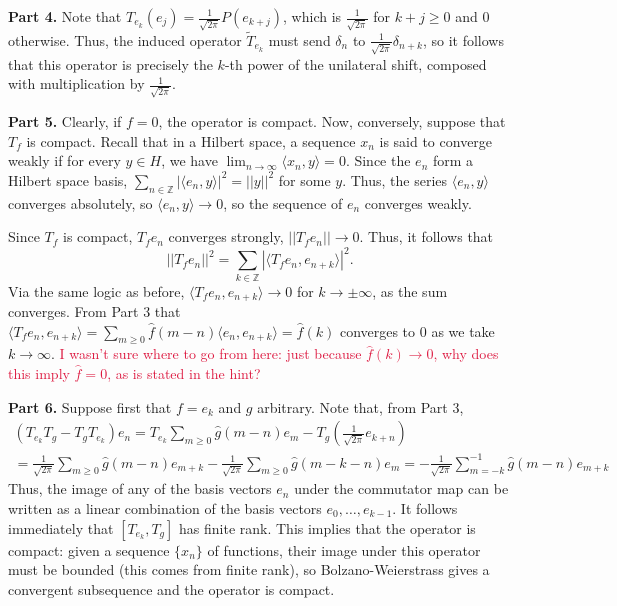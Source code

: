 \documentclass[aps,pra,showpacs,notitlepage,onecolumn,superscriptaddress,nofootinbib]{revtex4-1}
\newcommand{\pop}[1]{\textcolor{crimson}{#1}}
\theoremstyle{definition}
\begin{document}
\noindent \textbf{Part 4.} Note that $T_{e_k}(e_j) = \frac{1}{\sqrt{2\pi}} P(e_{k + j})$, which is $\frac{1}{\sqrt{2\pi}}$ for $k + j \geq 0$ and $0$ otherwise. Thus, the induced operator $\widetilde{T}_{e_k}$ must send $\delta_{n}$ to $\frac{1}{\sqrt{2\pi}} \delta_{n + k}$,
so it follows that this operator is precisely the $k$-th power of the unilateral shift, composed with multiplication by $\frac{1}{\sqrt{2\pi}}$.
\newline

\noindent \textbf{Part 5.} Clearly, if $f = 0$, the operator is compact. Now, conversely, suppose that $T_f$ is compact. Recall that in a Hilbert space, a sequence $x_n$ is said to converge weakly if for every $y \in H$,
we have $\lim_{n \to \infty} \langle x_n, y \rangle = 0$. Since the $e_n$ form a Hilbert space basis, $\sum_{n \in \mathbb{Z}} |\langle e_n, y \rangle|^2 = ||y||^2$ for some $y$. Thus, the series $\langle e_n, y \rangle$
converges absolutely, so $\langle e_n, y \rangle \rightarrow 0$, so the sequence of $e_n$ converges weakly.
\newline

\noindent Since $T_f$ is compact, $T_fe_n$ converges strongly, $||T_f e_n|| \rightarrow 0$. Thus, it follows that
\begin{equation}
  ||T_f e_n ||^2 = \displaystyle\sum_{k \in \mathbb{Z}} | \langle T_f e_n, e_{n + k} \rangle|^2.
\end{equation}
Via the same logic as before, $\langle T_f e_n, e_{n + k} \rangle \rightarrow 0$ for $k \to \pm \infty$, as the sum converges. From Part 3 that $\langle T_f e_n, e_{n + k} \rangle = \sum_{m \geq 0} \hat{f}(m - n) \langle e_n, e_{n + k} \rangle = \hat{f}(k)$
converges to $0$ as we take $k \to \infty$. \pop{I wasn't sure where to go from here: just because $\hat{f}(k) \to 0$, why does this imply $\hat{f} = 0$, as is stated in the hint?}
\newline

\noindent \textbf{Part 6.} Suppose first that $f = e_k$ and $g$ arbitrary. Note that, from Part 3,
\begin{multline}
  (T_{e_k} T_g - T_g T_{e_k}) e_n = T_{e_k} \displaystyle\sum_{m \geq 0} \hat{g}(m - n) e_m - T_g \left( \frac{1}{\sqrt{2\pi}} e_{k + n} \right)
  \\ = \frac{1}{\sqrt{2\pi}} \displaystyle\sum_{m \geq 0} \hat{g}(m - n) e_{m + k} - \frac{1}{\sqrt{2\pi}} \displaystyle\sum_{m \geq 0} \hat{g}(m - k - n) e_{m} = -\frac{1}{\sqrt{2\pi}} \displaystyle\sum_{m = -k}^{-1} \hat{g}(m - n) e_{m + k}
\end{multline}
Thus, the image of any of the basis vectors $e_n$ under the commutator map can be written as a linear combination of the basis vectors $e_{0}, \dots, e_{k - 1}$. It follows immediately that $[T_{e_k}, T_g]$ has finite rank.
This implies that the operator is compact: given a sequence $\{x_n\}$ of functions, their image under this operator must be bounded (this comes from finite rank), so Bolzano-Weierstrass gives a convergent subsequence and the operator is compact.
\newline
\end{document}
